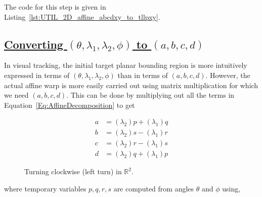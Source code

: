 The code for this step is given in Listing~\ref{lst:UTIL_2D_affine_abcdxy_to_tllpxy}.

\subsection{\underline{Converting  $(\theta, \lambda_1, \lambda_2, \phi)$ to $(a, b, c, d)$}}
In visual tracking, the initial target planar bounding region is more intuitively expressed in terms of $(\theta, \lambda_1, \lambda_2, \phi)$ than in terms of $(a, b, c, d)$.  However, the actual affine warp is more easily carried out using matrix multiplication for which we need $(a, b, c, d)$.  This can be done by multiplying out all the terms in Equation~\ref{Eq:AffineDecomposition} to get

\begin{equation}
\boxed{
\begin{array}{llll}
a &= (\lambda_2) p + (\lambda_1) q\\
b &= (\lambda_2) s  - (\lambda_1) r \\
c &= (\lambda_2) r  - (\lambda_1) s \\
d &= (\lambda_2)q + (\lambda_1) p
\end{array}}
\label{Eqn:tllpxy_to_abcdxy}
\end{equation}

								\begin{figure}
								\centering
								\caption{Turning clockwise (left turn) in $\mathbb{R}^2$.}
								\label{fig:left_turn}
								\end{figure}



where temporary variables $p, q, r, s$ are computed from angles $\theta$ and $\phi$ using,

